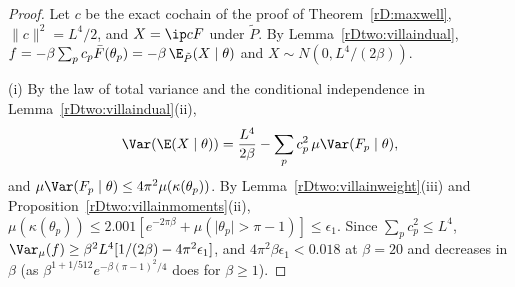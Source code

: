 \begin{proof}
Let $c$ be the exact cochain of the proof of Theorem~\ref{rD:maxwell},
$\lVert c\rVert^2=L^4/2$, and $X=\ip cF$ under $\tilde P$. By
Lemma~\ref{rDtwo:villaindual}, $f=-\beta\sum_pc_p\bar F(\theta_p)=-\beta\,
\E_{\tilde P}(X\mid\theta)$ and $X\sim N(0,L^4/(2\beta))$.

(i) By the law of total variance and the conditional independence in
Lemma~\ref{rDtwo:villaindual}(ii),
\[
\Var(\E(X\mid\theta))=\frac{L^4}{2\beta}-\sum_pc_p^2\,\mu\Var(F_p\mid\theta),
\]
and $\mu\Var(F_p\mid\theta)\le4\pi^2\mu(\kappa(\theta_p))$. By Lemma~\ref{rDtwo:villainweight}(iii) and
Proposition~\ref{rDtwo:villainmoments}(ii), $\mu(\kappa(\theta_p))\le2.001[
e^{-2\pi\beta}+\mu(\lvert\theta_p\rvert>\pi-1)]\le\epsilon_1$. Since $\sum_p
c_p^2\le L^4$, $\Var_\mu(f)\ge\beta^2L^4[1/(2\beta)-4\pi^2\epsilon_1]$, and
$4\pi^2\beta\epsilon_1<0.018$ at $\beta=20$ and decreases in $\beta$ (as
$\beta^{1+1/512}e^{-\beta(\pi-1)^2/4}$ does for $\beta\ge1$).


\end{proof}
